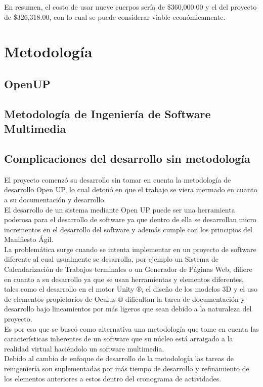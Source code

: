 En resumen, el costo de usar nueve cuerpos sería de \$360,000.00 y el del proyecto de \$326,318.00, con lo cual se puede considerar viable económicamente.\\

\section{Metodología}

\subsection{OpenUP}

\subsection{Metodología de Ingeniería de Software Multimedia}

\subsection{Complicaciones del desarrollo sin metodología}
El proyecto comenzó su desarrollo sin tomar en cuenta la metodología de desarrollo Open UP, lo cual detonó en que el trabajo se viera mermado en cuanto a su documentación y desarrollo.\\
El desarrollo de un sistema mediante Open UP puede ser una herramienta poderosa para el desarrollo de software ya que dentro de ella se desarrollan micro incrementos en el desarrollo del software y además cumple con los principios del Manifiesto Ágil\cite{beck2001manifesto}.\\
La problemática surge cuando se intenta implementar en un proyecto de software diferente al cual usualmente se desarrolla, por ejemplo un Sistema de Calendarización de Trabajos terminales o un Generador de Páginas Web, difiere en cuanto a su desarrollo ya que se usan herramientas y elementos diferentes, tales como el desarrollo en el motor Unity ®, el diseño de los modelos 3D y el uso de elementos propietarios de Oculus ® dificultan la tarea de documentación y desarrollo bajo lineamientos por más ligeros que sean debido a la naturaleza del proyecto.\\
Es por eso que se buscó como alternativa una metodología que tome en cuenta las características inherentes de un software que su núcleo está arraigado a la realidad virtual haciéndolo un software multimedia.\\
Debido al cambio de enfoque de desarrollo de la metodología las tareas de reingeniería son suplementadas por más tiempo de desarrollo y refinamiento de los elementos anteriores a estos dentro del cronograma de actividades.\\


